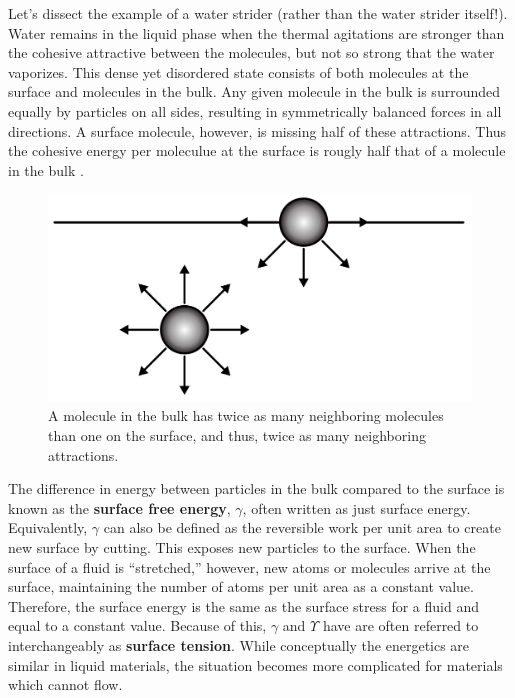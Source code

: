 Let's dissect the example of a water strider (rather than the water strider itself!). Water remains in the liquid phase when the thermal agitations are stronger than the cohesive attractive between the molecules, but not so strong that the water vaporizes. This dense yet disordered state consists of both molecules at the surface and molecules in the bulk. Any given molecule in the bulk is surrounded equally by particles on all sides, resulting in symmetrically balanced forces in all directions. A surface molecule, however, is missing half of these attractions. Thus the cohesive energy per moleculue at the surface is rougly half that of a molecule in the bulk \cite{GennesPierre-Gillesde2003Cawp}. 
\begin{figure}
	\centering
	\includegraphics[width=0.7\linewidth]{Chapters/Figures/surface_energy_origin}
	\caption[Surface Free Energy]{A molecule in the bulk has twice as many neighboring molecules than one on the surface, and thus, twice as many neighboring attractions. }
	\label{fig:surfaceenergyorigin}
\end{figure}
The difference in energy between particles in the bulk compared to the surface is known as the \textbf{surface free energy}, $\gamma$, often written as just surface energy. Equivalently, $\gamma$ can also be defined as the reversible work per unit area to create new surface by cutting. This exposes new particles to the surface. When the surface of a fluid is ``stretched,'' however, new atoms or molecules arrive at the surface, maintaining the number of atoms per unit area as a constant value. Therefore, the surface energy is the same as the surface stress for a fluid and equal to a constant value. Because of this, $\gamma$ and $\Upsilon$ have are often referred to interchangeably as \textbf{surface tension}. While conceptually the energetics are similar in liquid materials, the situation becomes more complicated for materials which cannot flow.


